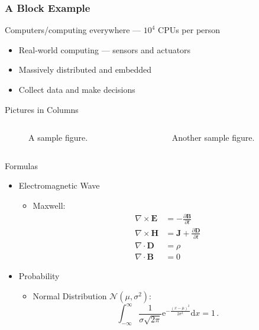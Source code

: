 \documentclass[onlycurpagenum,infolines]{beamer}
\begin{document}
\begin{frame}
  \frametitle{A Block Example}
  \begin{block}{Computers/computing everywhere --- $10^4$ CPUs per person}
    \begin{itemize}
      \item Real-world computing --- sensors and actuators
      \item Massively distributed and embedded
      \item Collect data and make decisions
    \end{itemize}
  \end{block}
\end{frame}

\begin{frame}{Pictures in Columns}
  \begin{columns}
    \begin{column}{.5\textwidth}
      \begin{figure}[htbp]
        \centering
        \caption{A sample figure.}
      \end{figure}
    \end{column}
    \begin{column}{.5\textwidth}
      \begin{figure}[htbp]
        \centering
        \caption{Another sample figure.}
      \end{figure}
    \end{column}
  \end{columns}
\end{frame}

\begin{frame}{Formulas}
  \begin{itemize}
    \item Electromagnetic Wave
      \begin{itemize}
        \item Maxwell:
          \begin{align}
            \nabla \times \mathbf{E} & = - \frac{\partial
            \mathbf{B}}{\partial t}\\
            \nabla \times \mathbf{H} & = \mathbf{J} +
            \frac{\partial \mathbf{D}}{\partial t}\\
            \nabla \cdot \mathbf{D} & = \rho \\
            \nabla \cdot\mathbf{B} & = 0
            \label{eqn:maxwell}
          \end{align}
      \end{itemize}
    \item Probability
      \begin{itemize}
        \item Normal Distribution $\mathcal{N}(\mu,\sigma^2)$:
          \[
          \int_{-\infty}^{\infty}\frac{1}{\sigma\sqrt{2\pi}}\mathrm{e}^{-\frac{(x-\mu)^2}{2\sigma^2}}\mathrm{d}x= 1 \, .
          \]
      \end{itemize}
  \end{itemize}
\end{frame}
\end{document}
